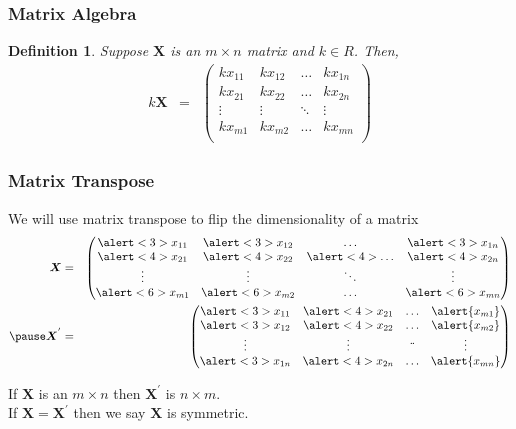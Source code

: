 \documentclass[handout]{beamer}
\newtheorem{defn}{Definition}
\numberwithin{equation}{section}
\begin{document}
\begin{frame}
\frametitle{Matrix Algebra} 
\begin{defn}
Suppose $\boldsymbol{X}$ is an $m \times n$ matrix and $k \in R$.  Then, 
\begin{eqnarray}
k \boldsymbol{X} & =&  \begin{pmatrix} 
k x_{11} & k x_{12} & \hdots &  k x_{1n} \\
k x_{21} & k x_{22} & \hdots & k x_{2n} \\
\vdots & \vdots & \ddots & \vdots \\
k x_{m1} & k x_{m2} & \hdots & k x_{mn} \\
\end{pmatrix}
\nonumber 
\end{eqnarray}

\end{defn}

\end{frame}



\begin{frame}
\frametitle{Matrix Transpose} 

We will use matrix transpose to flip the dimensionality of a matrix \pause \\

\begin{eqnarray}
\boldsymbol{X} & = & \begin{pmatrix} 
 \alert<3>{x_{11}} & \alert<3>{x_{12}} & \hdots & \alert<3>{x_{1n}} \\
\alert<4>{x_{21}} & \alert<4>{x_{22}} & \alert<4>{\hdots} & \alert<4>{x_{2n}} \\
\vdots & \vdots & \ddots & \vdots \\
\alert<6>{x_{m1}} & \alert<6>{x_{m2}} & \hdots & \alert<6>{x_{mn} } \\
\end{pmatrix}  \nonumber  \\
\pause
\boldsymbol{X}^{'} &  = &  \begin{pmatrix} 
\alert<3>{x_{11}} &  \alert<4>{x_{21} } & \hdots& \alert{x_{m1} } \\
\alert<3>{x_{12}} & \alert<4>{x_{22} } & \hdots &\alert{x_{m2} } \\
\vdots & \vdots & \ddot & \vdots\\
\alert<3>{x_{1n} } & \alert<4>{x_{2n}} &\hdots & \alert{x_{mn} }\\
\end{pmatrix} 
\nonumber 
\end{eqnarray}


If $\boldsymbol{X}$ is an $m \times n$ then $\boldsymbol{X}^{'} $ is $n \times m$.  \\
If $\boldsymbol{X} = \boldsymbol{X}^{'}$ then we say $\boldsymbol{X}$ is symmetric. 

\end{frame}
\end{document}
